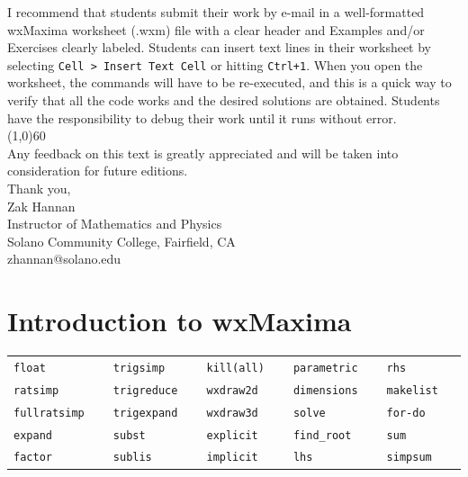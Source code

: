 \documentclass[10.5pt,twoside]{report}
\theoremstyle{definition}
\begin{document}
I recommend that students submit their work by e-mail in a well-formatted wxMaxima worksheet (.wxm) file with a clear header and Examples and/or Exercises clearly labeled.  Students can insert text lines in their worksheet by selecting \verb|Cell > Insert Text Cell| or hitting \verb|Ctrl+1|.  When you open the worksheet, the commands will have to be re-executed, and this is a quick way to verify that all the code works and the desired solutions are obtained.  Students have the responsibility to debug their work until it runs without error.\\

\line(1,0){60}
\linethickness{0.5mm}
${}$\\

Any feedback on this text is greatly appreciated and will be
taken into consideration for future editions.  \\

Thank you,\\

Zak Hannan\\
Instructor of Mathematics and Physics\\
Solano Community College, Fairfield, CA\\
zhannan@solano.edu








\pagebreak


\setcounter{mtc}{1}

\chapter{Introduction to wxMaxima}


\vspace*{\fill}

\minitoc

\vspace*{\fill}


\newline
\newline

\begin{tabular}{l l l l l}
 \verb|float   |   &\verb|trigsimp   |   &\verb|kill(all)   |  &\verb|parametric   |  &\verb|rhs   |  \\
 \verb|ratsimp   |   &\verb|trigreduce   |   &\verb|wxdraw2d   |  &\verb|dimensions   |  &\verb|makelist   |  \\
 \verb|fullratsimp   |   &\verb|trigexpand   |   &\verb|wxdraw3d   |  &\verb|solve   |  &\verb|for-do   |  \\
 \verb|expand   |   &\verb|subst   |   &\verb|explicit   |  &\verb|find_root   | &\verb|sum   |   \\
 \verb|factor   |   &\verb|sublis   |   &\verb|implicit   | &\verb|lhs   |  &\verb|simpsum   |   \\
\end{tabular}
\end{document}
